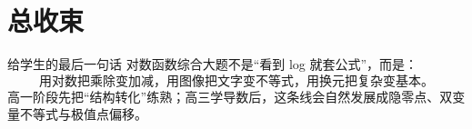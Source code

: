\documentclass[11pt,a4paper]{ctexart}
\begin{document}
\section*{总收束}

\begin{keybox}{给学生的最后一句话}
对数函数综合大题不是“看到 log 就套公式”，而是：
\[
\boxed{\text{用对数把乘除变加减，用图像把文字变不等式，用换元把复杂变基本。}}
\]
高一阶段先把“结构转化”练熟；高三学导数后，这条线会自然发展成隐零点、双变量不等式与极值点偏移。
\end{keybox}
\end{document}
